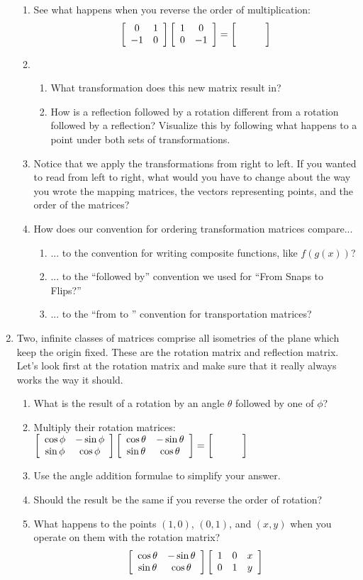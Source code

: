 \documentclass[../textbook.tex]{subfiles}
\begin{document}
\begin{enumerate}
\begin{enumerate}
\item See what happens when you reverse the order of multiplication: \label{prob:cm_fill_in_blank_end}
$$\twomat{0}{1}{-1}{0}\twomat{1}{0}{0}{-1}=\blanktwomat$$
\item \begin{enumerate}
\item What transformation does this new matrix result in?
\item How is a reflection followed by a rotation different from a rotation followed by a reflection? Visualize this by following what happens to a point under both sets of transformations.
\end{enumerate}
\item Notice that we apply the transformations from right to left. If you wanted to read from left to right, what would you have to change about the way you wrote the mapping matrices, the vectors representing points, and the order of the matrices?
\item How does our convention for ordering transformation matrices compare...
\begin{enumerate}
\item ... to the convention for writing composite functions, like $f(g(x))$?
\item ... to the ``followed by'' convention we used for ``From Snaps to Flips?''
\item ... to the ``from \underline{\phantom{egg}} to \underline{\phantom{egg}}'' convention for transportation matrices?
\end{enumerate}
\end{enumerate}
\item Two, infinite classes of matrices comprise all isometries of the plane which keep the origin fixed. These are the rotation matrix and reflection matrix. Let's look first at the rotation matrix and make sure that it really always works the way it should.
\begin{enumerate}
\item What is the result of a rotation by an angle $\theta$ followed by one of $\phi$?
\item Multiply their rotation matrices: $\twomat{\cos \phi}{-\sin \phi}{\sin\phi}{\cos\phi} \twomat{\cos \theta}{-\sin \theta}{\sin\theta}{\cos\theta}=\blanktwomat$
\item Use the angle addition formulae to simplify your answer.
\item Should the result be the same if you reverse the order of rotation?
\item What happens to the points $(1,0)$, $(0,1)$, and $(x,y)$ when you operate on them with the rotation matrix? $$\left[\begin{array}{cc} \cos \theta & -\sin \theta \\ \sin\theta & \cos\theta \end{array}\right]\left[\begin{array}{ccc} 1 & 0 & x \\ 0 & 1 & y \end{array}\right]$$

\end{enumerate}
\end{enumerate}
\end{document}
